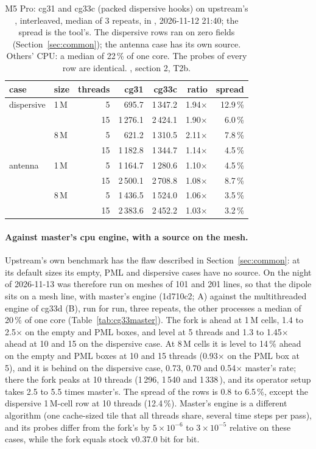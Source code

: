 \begin{table}[H]\centering\small
\begin{tabular}{@{}llrrrrr@{}}
\toprule
case & size & threads & cg31 & cg33c & ratio & spread \\
\midrule
dispersive & 1\,M & 5 & 695.7 & 1\,347.2 & 1.94$\times$ & 12.9\,\% \\
 & & 15 & 1\,276.1 & 2\,424.1 & 1.90$\times$ & 6.0\,\% \\
 & 8\,M & 5 & 621.2 & 1\,310.5 & 2.11$\times$ & 7.8\,\% \\
 & & 15 & 1\,182.8 & 1\,344.7 & 1.14$\times$ & 4.5\,\% \\
antenna & 1\,M & 5 & 1\,164.7 & 1\,280.6 & 1.10$\times$ & 4.5\,\% \\
 & & 15 & 2\,500.1 & 2\,708.8 & 1.08$\times$ & 8.7\,\% \\
 & 8\,M & 5 & 1\,436.5 & 1\,524.0 & 1.06$\times$ & 3.5\,\% \\
 & & 15 & 2\,383.6 & 2\,452.2 & 1.03$\times$ & 3.2\,\% \\
\bottomrule
\end{tabular}
\caption{M5 Pro: cg31 and cg33c (packed dispersive hooks) on upstream's , interleaved, median of 3
repeats, in \MC, 2026-11-12 21:40; the spread is the tool's. The dispersive rows ran on zero fields (Section~\ref{sec:common});
the antenna case has its own source. Others' CPU: a median of 22\,\% of one core. The probes of every row are identical.
, section 2, T2b.}\label{tab:cg33ade}
\end{table}

\paragraph{Against master's cpu engine, with a source on the mesh.} Upstream's own benchmark has the flaw described in
Section~\ref{sec:common}: at its default sizes its empty, PML and dispersive cases have no source. On the night of
2026-11-13  was therefore run on meshes of 101 and 201 lines, so that the dipole sits on a mesh line, with
master's  engine (1d710c2; A) against the multithreaded engine of cg33d (B), run for run, three repeats, the
other processes a median of 20\,\% of one core (Table~\ref{tab:cg33master}). The fork is ahead at 1\,M cells, 1.4 to
2.5$\times$ on the empty and PML boxes, and level at 5 threads and 1.3 to 1.45$\times$ ahead at 10 and 15 on the dispersive case. At
8\,M cells it is level to 14\,\% ahead on the empty and PML boxes at 10 and 15 threads (0.93$\times$ on the PML box at 5), and it
is behind on the dispersive case, 0.73, 0.70 and 0.54$\times$ master's rate; there the fork peaks at 10 threads
(1\,296, 1\,540 and 1\,338\,\MC), and its operator setup takes 2.5 to 5.5 times master's. The spread of the rows is 0.8 to
6.5\,\%, except the dispersive 1\,M-cell row at 10 threads (12.4\,\%). Master's  engine is a different algorithm (one
cache-sized tile that all threads share, several time steps per pass), and its probes differ from the fork's by $5\times10^{-6}$
to $3\times10^{-5}$ relative on these cases, while the fork equals stock v0.37.0 bit for bit.

